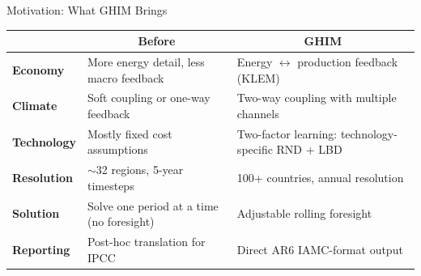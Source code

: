 \documentclass[aspectratio=169, 10pt]{beamer}
\begin{document}
\begin{frame}{Motivation: What GHIM Brings}
\vspace{1.5em}
\centering
\footnotesize
\renewcommand{\arraystretch}{2.4}
\begin{tabular}{@{} l l l @{}}
\toprule
& \multicolumn{1}{c}{\textbf{\normalsize Before}} & \multicolumn{1}{c}{\textbf{\normalsize GHIM}} \\
\midrule
\rowcolor{blue!6}
\textbf{\color{blue!60}Economy}
  & More energy detail, less macro feedback
  & Energy $\leftrightarrow$ production feedback (KLEM) \\
\textbf{\color{red!60!black}Climate}
  & Soft coupling or one-way feedback
  & Two-way coupling with multiple channels \\
\rowcolor{purple!6}
\textbf{\color{purple!60}Technology}
  & Mostly fixed cost assumptions
  & Two-factor learning: technology-specific RND + LBD \\
\rowcolor{green!6}
\textbf{\color{green!50!black}Resolution}
  & $\sim$32 regions, 5-year timesteps
  & 100+ countries, annual resolution \\
\textbf{\color{orange!70!black}Solution}
  & Solve one period at a time (no foresight)
  & Adjustable rolling foresight \\
\rowcolor{cyan!6}
\textbf{\color{cyan!60!black}Reporting}
  & Post-hoc translation for IPCC
  & Direct AR6 IAMC-format output \\
\bottomrule
\end{tabular}
\end{frame}
\end{document}
